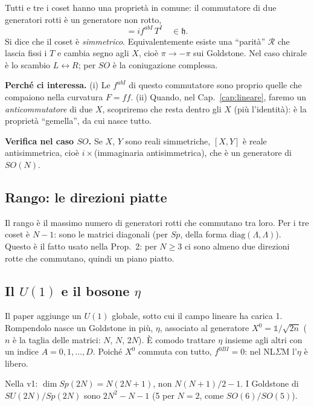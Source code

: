 \documentclass[11pt,a4paper]{article}
\numberwithin{equation}{section}
\theoremstyle{remark}
\newcommand{\h}{\mathfrak{h}}
\newcommand{\one}{\mathbb{1}}
\begin{document}
Tutti e tre i coset hanno una proprietà in comune: il commutatore di due generatori rotti è un generatore non rotto,
\begin{equation}
[X^a,X^b]=i f^{abI}\,T^I\quad\in\h .
\end{equation}
Si dice che il coset è \emph{simmetrico}. Equivalentemente esiste una ``parità'' $\mathcal R$ che lascia fissi i $T$ e cambia segno agli $X$, cioè $\pi\to-\pi$ sui Goldstone. Nel caso chirale è lo scambio $L\leftrightarrow R$; per $SO$ è la coniugazione complessa.

\textbf{Perché ci interessa.} (i) Le $f^{abI}$ di questo commutatore sono proprio quelle che compaiono nella curvatura $F=ff$. (ii) Quando, nel Cap.~\ref{cap:lineare}, faremo un \emph{anticommutatore} di due $X$, scopriremo che resta dentro gli $X$ (più l'identità): è la proprietà ``gemella'', da cui nasce tutto.

\textbf{Verifica nel caso $SO$.} Se $X$, $Y$ sono reali simmetriche, $[X,Y]$ è reale antisimmetrica, cioè $i\times$(immaginaria antisimmetrica), che è un generatore di $SO(N)$. \checkmark

\subsection{Rango: le direzioni piatte}

Il rango è il massimo numero di generatori rotti che commutano tra loro. Per i tre coset è $N-1$: sono le matrici diagonali (per $Sp$, della forma $\mathrm{diag}(\Lambda,\Lambda)$). Questo è il fatto usato nella Prop.~2: per $N\ge3$ ci sono almeno due direzioni rotte che commutano, quindi un piano piatto.

\subsection{Il $U(1)$ e il bosone $\eta$}

Il paper aggiunge un $U(1)$ globale, sotto cui il campo lineare ha carica 1. Rompendolo nasce un Goldstone in più, $\eta$, associato al generatore $X^0=\one/\sqrt{2n}$ ($n$ è la taglia delle matrici: $N$, $N$, $2N$). È comodo trattare $\eta$ insieme agli altri con un indice $A=0,1,\dots,D$. Poiché $X^0$ commuta con tutto, $f^{0BI}=0$: nel NL$\Sigma$M l'$\eta$ è libero.

\begin{attento}
Nella v1: $\dim Sp(2N)=N(2N+1)$, non $N(N+1)/2-1$. I Goldstone di $SU(2N)/Sp(2N)$ sono $2N^2-N-1$ (5 per $N=2$, come $SO(6)/SO(5)$).
\end{attento}
\end{document}
